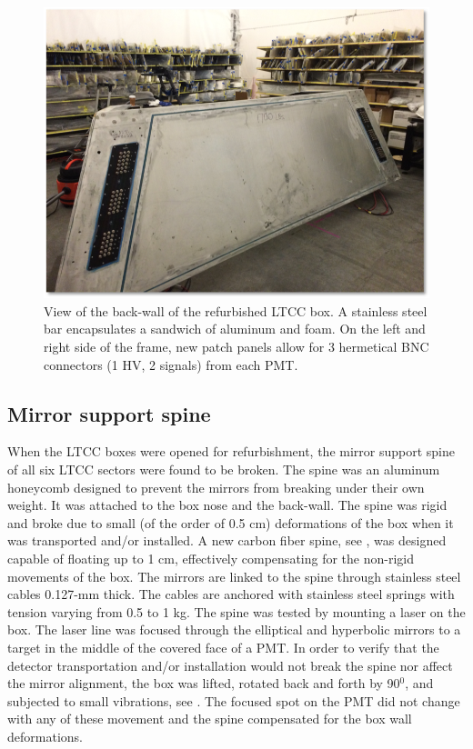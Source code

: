 \begin{figure}
	\centering
	\includegraphics[width=0.95\columnwidth,keepaspectratio]{img/backWall.png}
	\caption{View of the back-wall of the refurbished LTCC box. A stainless steel bar encapsulates a sandwich
             of aluminum and foam. On the left and right side of the frame, new patch panels allow for 3 hermetical
             BNC connectors (1 HV, 2 signals) from each PMT. }
	\label{fig:backWall}
\end{figure}


\subsection{Mirror support spine}

When the LTCC boxes were opened for refurbishment, the mirror support spine of all six LTCC sectors were found to be broken.
The spine was an aluminum honeycomb designed to prevent the mirrors from breaking under their own weight.
It was attached to the box nose and the back-wall. The spine was rigid and broke due to small
(of the order of 0.5 cm) deformations of the box when it was transported and/or installed.
A new carbon fiber spine, see , was designed capable of floating up to 1 cm, effectively compensating
for the non-rigid movements of the box.
The mirrors are linked to the spine through stainless steel cables 0.127-mm thick.
The cables are anchored with stainless steel springs with tension varying from 0.5 to 1 kg.
The spine was tested by mounting a laser on the box. The laser line was focused through the elliptical
and hyperbolic mirrors to a target in the middle of the covered face of a PMT.
In order to verify that the detector transportation and/or installation would not break the spine
nor affect the mirror alignment, the box was lifted, rotated back and forth by 90$^0$, and subjected
to small vibrations, see . The focused spot on the PMT did not change with any of these movement and the spine
compensated for the box wall deformations.

